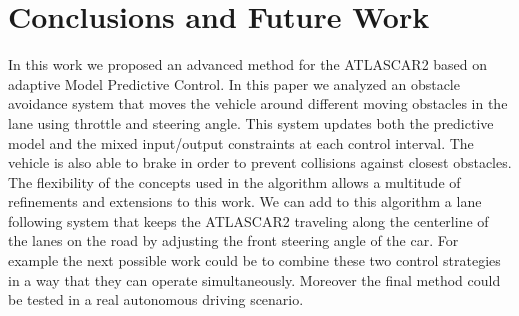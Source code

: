 \documentclass[conference, 11pt]{IEEEtran}
\begin{document}
\section{Conclusions and Future Work}
In this work we proposed an advanced method for the ATLASCAR2 based on adaptive Model Predictive Control. In this paper we analyzed an obstacle avoidance system that moves the vehicle around different moving obstacles in the lane using throttle and steering angle. This system updates both the predictive model and the mixed input/output constraints at each control interval. The vehicle is also able to brake in order to prevent collisions against closest obstacles.
The flexibility of the concepts used in the algorithm allows a multitude of refinements and extensions to this work. We can add to this algorithm a lane following system that keeps the ATLASCAR2 traveling along the centerline of the lanes on the road by adjusting the front steering angle of the car. For example the next possible work could be to combine these two control strategies in a way that they can operate simultaneously. Moreover the final method could be tested in a real autonomous driving scenario.
\end{document}
